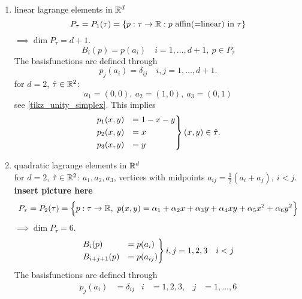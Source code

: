 \begin{example}
	\begin{enumerate}[label=(\roman*)]
		\item linear lagrange elements in $\mathbb{R}^d$
		\begin{equation*}
			P_{\tau} = P_1(\tau) = \left\{ p:\tau \to \mathbb{R}: p \text{ affin(=linear) in }\tau \right\} 
		\end{equation*}
		$\implies \dim P_{\tau} = d+1$.
		\begin{equation*}
			B_i(p) = p(a_i)\quad i = 1, \dots,d+1,\ p \in P_{\tau}
		\end{equation*}
		The basisfunctions are defined through
		\begin{equation*}
			p_j(a_i) = \delta_{ij} \quad i,j = 1,\dots ,d+1.
		\end{equation*}
		for \underline{$d=2$}, $\hat{\tau} \in \mathbb{R}^2$:
		\begin{equation*}
			a_1= (0,0),\ a_2 = (1,0),\ a_3 = (0,1)
		\end{equation*}
		see \eqref{tikz_unity_simplex}. This implies
		\begin{equation*}
			\begin{rcases}
			p_1(x,y) &= 1-x-y\\
			p_2(x,y) &= x\\
			p_3(x,y) &= y
			\end{rcases}
			(x,y) \in \hat{\tau}.
		\end{equation*} 
		\item quadratic lagrange elements in $\mathbb{R}^d$\\
		for \underline{$d=2$}, $\hat{\tau} \in \mathbb{R}^2$: $a_1,a_2,a_3$, vertices with midpoints $a_{ij} = \frac{1}{2}(a_i +a_j),\ i < j$.\\
		\textbf{insert picture here}
		\begin{equation*}
			P_{\tau} = P_2(\tau) = \Big\{ p:\tau \to \R,\ p(x,y) = \alpha_1 + \alpha_2 x + \alpha_3 y + \alpha_4 xy + \alpha_5 x^2 + \alpha_6 y^2 \Big\}
		\end{equation*}
		$\implies  \dim P_{\tau} = 6$.
		\begin{equation*}
			\begin{rcases}
			B_i(p) &= p(a_i)\\
			B_{i+j+1}(p) &= p(a_{ij})
			\end{rcases}
			i,j = 1,2,3 \quad i<j
		\end{equation*}
		The basisfunctions are defined through 
		\begin{align*}
			p_j(a_i) &= \delta_{ij} &  i &=1,2,3, &  j&= 1,\dots,6\\

\end{align*}
\end{enumerate}
\end{example}
